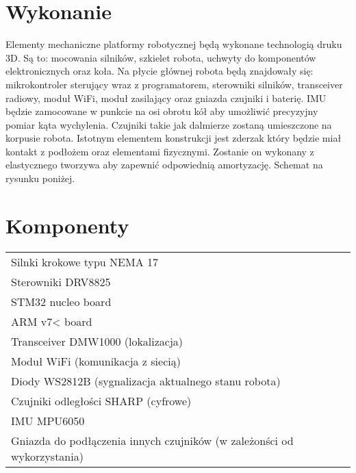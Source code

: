 \documentclass[a4paper, 12pt]{article}
\begin{document}
\section{Wykonanie}
Elementy mechaniczne platformy robotycznej będą wykonane technologią druku 3D. Są to: mocowania silników, szkielet robota, uchwyty do komponentów elektronicznych oraz koła. Na płycie głównej robota będą znajdowały się: mikrokontroler sterujący wraz z programatorem, sterowniki silników, transceiver radiowy, moduł WiFi, moduł zasilający oraz gniazda czujniki i baterię. IMU będzie zamocowane w punkcie na osi obrotu kół aby umożliwić precyzyjny pomiar kąta wychylenia. Czujniki takie jak dalmierze zostaną umieszczone na korpusie robota. Istotnym elementem konstrukcji jest zderzak który będzie miał kontakt z podłożem oraz elementami fizycznymi. Zostanie on wykonany z elastycznego tworzywa aby zapewnić odpowiednią amortyzację. Schemat na rysunku poniżej. 

\section{Komponenty}
\begin{table}[ht]
	\normalsize
	\begin{tabular}{ll}

    Silnki krokowe typu NEMA 17\\
    Sterowniki DRV8825\\
    STM32 nucleo board\\
    ARM v7< board\\
    Transceiver DMW1000 (lokalizacja)\\
    Moduł WiFi (komunikacja z siecią)\\
    Diody WS2812B (sygnalizacja aktualnego stanu robota)\\
    Czujniki odległości SHARP (cyfrowe)\\
    IMU MPU6050\\
    Gniazda do podłączenia innych czujników (w zależonści od wykorzystania)\\
    
	\end{tabular}
\end{table}


	
\end{document}

